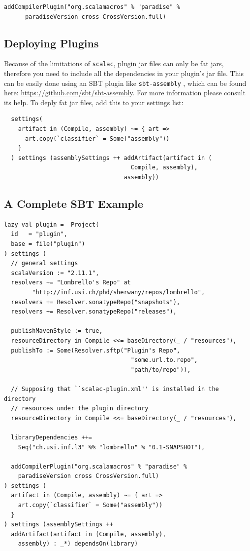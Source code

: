 \documentclass{article}
\renewcommand\c[1]{
  \ifmmode
    \text{#1}
  \else
    \lstinline{#1}
  \fi
}
\begin{document}
\begin{verbatim}
addCompilerPlugin("org.scalamacros" % "paradise" % 
      paradiseVersion cross CrossVersion.full)
\end{verbatim}


\subsection{Deploying Plugins}

Because of the limitations of \texttt{scalac}, plugin jar files can only be fat
jars, therefore you need to include all the dependencies in your plugin's jar
file. This can be easily done using an SBT plugin like \c{sbt-assembly}, which
can be found here: \url{https://github.com/sbt/sbt-assembly}. For more
information please consult its help. To deply fat jar files, add this to your
settings list:

\begin{verbatim}
  settings(
    artifact in (Compile, assembly) ~= { art =>
      art.copy(`classifier` = Some("assembly"))
    }
  ) settings (assemblySettings ++ addArtifact(artifact in (
                                    Compile, assembly),
                                  assembly)) 
\end{verbatim}

\subsection{A Complete SBT Example}

\begin{verbatim}
lazy val plugin =  Project(
  id   = "plugin",
  base = file("plugin")
) settings (
  // general settings
  scalaVersion := "2.11.1",
  resolvers += "Lombrello's Repo" at 
        "http://inf.usi.ch/phd/sherwany/repos/lombrello",
  resolvers += Resolver.sonatypeRepo("snapshots"),
  resolvers += Resolver.sonatypeRepo("releases"),

  publishMavenStyle := true,
  resourceDirectory in Compile <<= baseDirectory(_ / "resources"),
  publishTo := Some(Resolver.sftp("Plugin's Repo", 
                                    "some.url.to.repo",
                                    "path/to/repo")),

  // Supposing that ``scalac-plugin.xml'' is installed in the directory
  // resources under the plugin directory
  resourceDirectory in Compile <<= baseDirectory(_ / "resources"),

  libraryDependencies ++= 
    Seq("ch.usi.inf.l3" %% "lombrello" % "0.1-SNAPSHOT"),

  addCompilerPlugin("org.scalamacros" % "paradise" % 
    paradiseVersion cross CrossVersion.full)
) settings (
  artifact in (Compile, assembly) ~= { art =>
    art.copy(`classifier` = Some("assembly"))
  }
) settings (assemblySettings ++ 
  addArtifact(artifact in (Compile, assembly), 
    assembly) : _*) dependsOn(library)
\end{verbatim}
\end{document}
